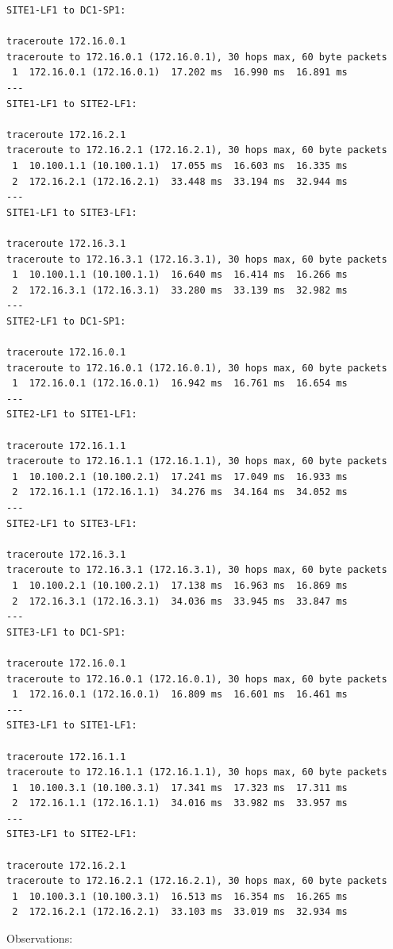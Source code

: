 \documentclass[11pt]{article}
\begin{document}
\begin{verbatim}
SITE1-LF1 to DC1-SP1:

traceroute 172.16.0.1
traceroute to 172.16.0.1 (172.16.0.1), 30 hops max, 60 byte packets
 1  172.16.0.1 (172.16.0.1)  17.202 ms  16.990 ms  16.891 ms
---
SITE1-LF1 to SITE2-LF1:

traceroute 172.16.2.1
traceroute to 172.16.2.1 (172.16.2.1), 30 hops max, 60 byte packets
 1  10.100.1.1 (10.100.1.1)  17.055 ms  16.603 ms  16.335 ms
 2  172.16.2.1 (172.16.2.1)  33.448 ms  33.194 ms  32.944 ms
---
SITE1-LF1 to SITE3-LF1:

traceroute 172.16.3.1
traceroute to 172.16.3.1 (172.16.3.1), 30 hops max, 60 byte packets
 1  10.100.1.1 (10.100.1.1)  16.640 ms  16.414 ms  16.266 ms
 2  172.16.3.1 (172.16.3.1)  33.280 ms  33.139 ms  32.982 ms
---
SITE2-LF1 to DC1-SP1:

traceroute 172.16.0.1
traceroute to 172.16.0.1 (172.16.0.1), 30 hops max, 60 byte packets
 1  172.16.0.1 (172.16.0.1)  16.942 ms  16.761 ms  16.654 ms
---
SITE2-LF1 to SITE1-LF1:

traceroute 172.16.1.1
traceroute to 172.16.1.1 (172.16.1.1), 30 hops max, 60 byte packets
 1  10.100.2.1 (10.100.2.1)  17.241 ms  17.049 ms  16.933 ms
 2  172.16.1.1 (172.16.1.1)  34.276 ms  34.164 ms  34.052 ms
---
SITE2-LF1 to SITE3-LF1:

traceroute 172.16.3.1
traceroute to 172.16.3.1 (172.16.3.1), 30 hops max, 60 byte packets
 1  10.100.2.1 (10.100.2.1)  17.138 ms  16.963 ms  16.869 ms
 2  172.16.3.1 (172.16.3.1)  34.036 ms  33.945 ms  33.847 ms
---
SITE3-LF1 to DC1-SP1:

traceroute 172.16.0.1
traceroute to 172.16.0.1 (172.16.0.1), 30 hops max, 60 byte packets
 1  172.16.0.1 (172.16.0.1)  16.809 ms  16.601 ms  16.461 ms
---
SITE3-LF1 to SITE1-LF1:

traceroute 172.16.1.1
traceroute to 172.16.1.1 (172.16.1.1), 30 hops max, 60 byte packets
 1  10.100.3.1 (10.100.3.1)  17.341 ms  17.323 ms  17.311 ms
 2  172.16.1.1 (172.16.1.1)  34.016 ms  33.982 ms  33.957 ms
---
SITE3-LF1 to SITE2-LF1:

traceroute 172.16.2.1
traceroute to 172.16.2.1 (172.16.2.1), 30 hops max, 60 byte packets
 1  10.100.3.1 (10.100.3.1)  16.513 ms  16.354 ms  16.265 ms
 2  172.16.2.1 (172.16.2.1)  33.103 ms  33.019 ms  32.934 ms
\end{verbatim}

Observations:
\end{document}
